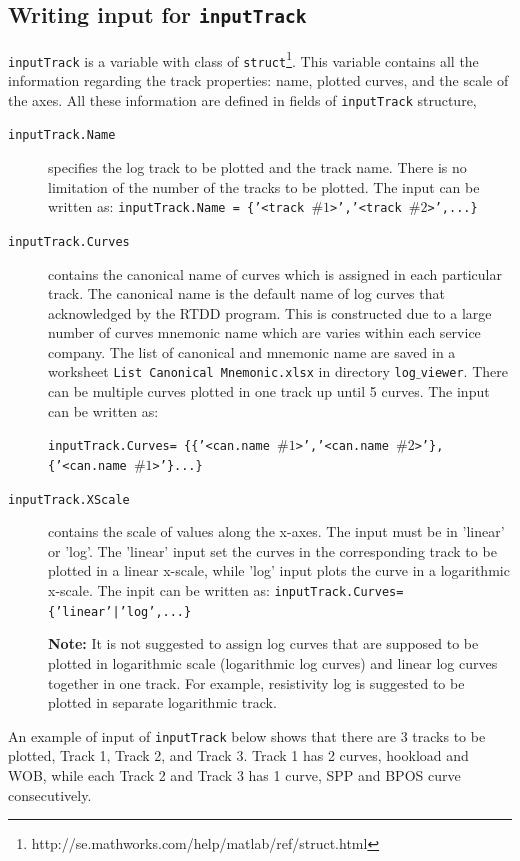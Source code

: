 \documentclass[12pt,a4paper,oneside]{report}
\begin{document}
\subsection{Writing input for \texttt{inputTrack}}
\label{ch:input_track}
\texttt{inputTrack} is a variable with class of \texttt{struct}\footnote{http://se.mathworks.com/help/matlab/ref/struct.html}. This variable contains all the information regarding the track properties: name, plotted curves, and the scale of the axes. All these information are defined in fields of \texttt{inputTrack} structure,
\begin{description}
\item[\texttt{inputTrack.Name}] specifies the log track to be plotted and the track name. There is no limitation of the number of the tracks to be plotted. The input can be written as: \texttt{inputTrack.Name = \{'<track $\#1$>','<track $\#2$>',...\}}

\item[\texttt{inputTrack.Curves}] contains the canonical name of curves which is assigned in each particular track. The canonical name is the default name of log curves that acknowledged by the RTDD program. This is constructed due to a large number of curves mnemonic name which are varies within each service company. The list of canonical and mnemonic name are saved in a worksheet \texttt{List Canonical Mnemonic.xlsx} in directory \texttt{log$\_$viewer}. There can be multiple curves plotted in one track up until 5 curves. The input can be written as:

\texttt{inputTrack.Curves= \{\{'<can.name $\#1$>','<can.name $\#2$>'\}, \{'<can.name $\#1$>'\}...\}}

\item[\texttt{inputTrack.XScale}] contains the scale of values along the x-axes. The input must be in 'linear' or 'log'. The 'linear' input set the curves in the corresponding track to be plotted in a linear x-scale, while 'log' input plots the curve in a logarithmic x-scale. The inpit can be written as:
\texttt{inputTrack.Curves= \{'linear'|'log',...\}}

\noindent \textbf{Note:} It is not suggested to assign log curves that are supposed to be plotted in logarithmic scale (logarithmic log curves) and linear log curves together in one track. For example, resistivity log is suggested to be plotted in separate logarithmic track.
\end{description}

An example of input of \texttt{inputTrack} below shows that there are 3 tracks to be plotted, Track 1, Track 2, and Track 3. Track 1 has 2 curves, hookload and WOB, while each Track 2 and Track 3 has 1 curve, SPP and BPOS curve consecutively.
\pagebreak
\end{document}
